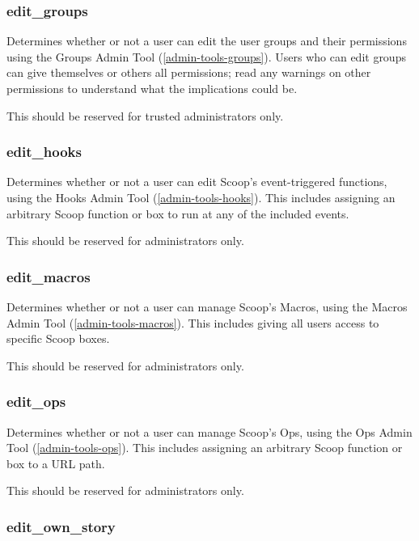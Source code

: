 \subsubsection{edit\_groups}
\label{perm-edit-groups}

Determines whether or not a user can edit the user groups and their permissions using the Groups Admin Tool (\ref{admin-tools-groups}).  Users who can edit groups can give themselves or others all permissions; read any warnings on other permissions to understand what the implications could be.

This should be reserved for trusted administrators only.

\subsubsection{edit\_hooks}
\label{perm-edit-hooks}

Determines whether or not a user can edit Scoop's event-triggered functions, using the Hooks Admin Tool (\ref{admin-tools-hooks}).  This includes assigning an arbitrary Scoop function or box to run at any of the included events.

This should be reserved for administrators only.

\subsubsection{edit\_macros}
\label{perm-edit-macros}

Determines whether or not a user can manage Scoop's Macros, using the Macros Admin Tool (\ref{admin-tools-macros}). This includes giving all users access to specific Scoop boxes.

This should be reserved for administrators only.

\subsubsection{edit\_ops}
\label{perm-edit-ops}

Determines whether or not a user can manage Scoop's Ops, using the Ops Admin Tool (\ref{admin-tools-ops}).  This includes assigning an arbitrary Scoop function or box to a URL path.

This should be reserved for administrators only.

\subsubsection{edit\_own\_story}
\label{perm-edit-own-story}

